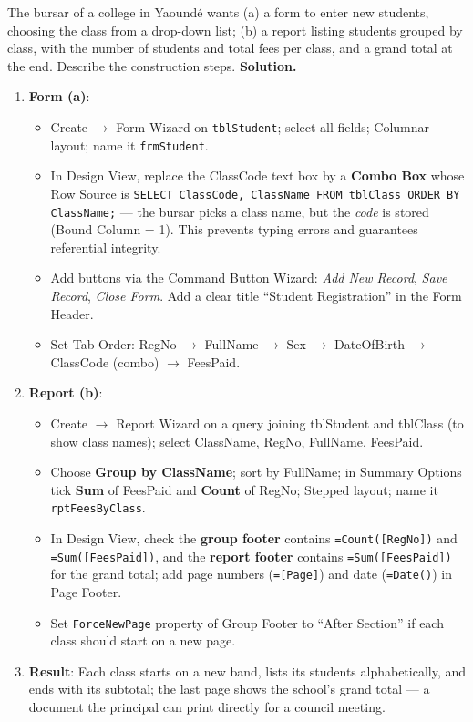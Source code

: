 \documentclass[11pt]{article}
\begin{document}
\begin{exoresolu}
The bursar of a college in Yaoundé wants (a) a form to enter new students, choosing the class from a drop-down list; (b) a report listing students grouped by class, with the number of students and total fees per class, and a grand total at the end. Describe the construction steps.
\tcblower
\textbf{Solution.}
\begin{enumerate}
\item \textbf{Form (a)}:
\begin{itemize}
\item Create $\rightarrow$ Form Wizard on \texttt{tblStudent}; select all fields; Columnar layout; name it \texttt{frmStudent}.
\item In Design View, replace the ClassCode text box by a \textbf{Combo Box} whose Row Source is \texttt{SELECT ClassCode, ClassName FROM tblClass ORDER BY ClassName;} --- the bursar picks a class name, but the \emph{code} is stored (Bound Column = 1). This prevents typing errors and guarantees referential integrity.
\item Add buttons via the Command Button Wizard: \emph{Add New Record}, \emph{Save Record}, \emph{Close Form}. Add a clear title ``Student Registration'' in the Form Header.
\item Set Tab Order: RegNo $\rightarrow$ FullName $\rightarrow$ Sex $\rightarrow$ DateOfBirth $\rightarrow$ ClassCode (combo) $\rightarrow$ FeesPaid.
\end{itemize}
\item \textbf{Report (b)}:
\begin{itemize}
\item Create $\rightarrow$ Report Wizard on a query joining tblStudent and tblClass (to show class names); select ClassName, RegNo, FullName, FeesPaid.
\item Choose \textbf{Group by ClassName}; sort by FullName; in Summary Options tick \textbf{Sum} of FeesPaid and \textbf{Count} of RegNo; Stepped layout; name it \texttt{rptFeesByClass}.
\item In Design View, check the \textbf{group footer} contains \texttt{=Count([RegNo])} and \texttt{=Sum([FeesPaid])}, and the \textbf{report footer} contains \texttt{=Sum([FeesPaid])} for the grand total; add page numbers (\texttt{=[Page]}) and date (\texttt{=Date()}) in Page Footer.
\item Set \texttt{ForceNewPage} property of Group Footer to ``After Section'' if each class should start on a new page.
\end{itemize}
\item \textbf{Result}: Each class starts on a new band, lists its students alphabetically, and ends with its subtotal; the last page shows the school's grand total --- a document the principal can print directly for a council meeting.
\end{enumerate}
\end{exoresolu}
\end{document}
